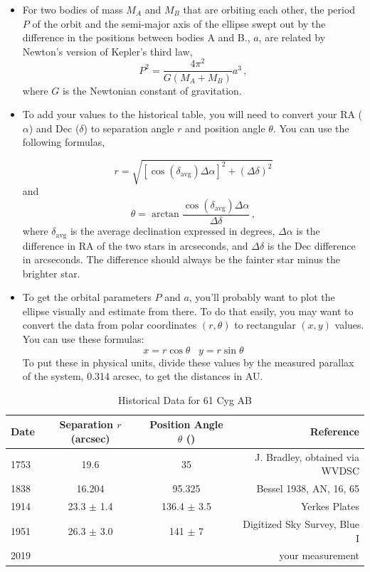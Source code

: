 \begin{itemize}
	\item For two bodies of mass $M_A$ and $M_B$ that are orbiting each other, the period $P$ of the orbit and the semi-major axis of the ellipse swept out by the difference in the positions between bodies A and B., $a$, are related by Newton's version of Kepler's third law,
	\begin{equation}
	P^2 = \frac{4\pi^2}{G(M_A + M_B)}a^3 \,,
	\end{equation}
	where $G$ is the Newtonian constant of gravitation.

	\item To add your values to the historical table, you will need to convert your RA ($\alpha$) and Dec ($\delta$) to separation angle $r$ and position angle $\theta$. You can use the following formulas,
	
	\begin{equation}
	r = \sqrt{[\cos(\delta_{\textrm{avg}})\Delta\alpha]^2 + (\Delta\delta)^2}
	\end{equation}
	and
	\begin{equation}
	\theta = \arctan{\frac{\cos(\delta_{\textrm{avg}})\Delta\alpha}{\Delta\delta}}\,,
	\end{equation}
	where $\delta_{\textrm{avg}}$ is the average declination expressed in degrees, $\Delta\alpha$ is the difference in RA of the two stars in arcseconds, and $\Delta\delta$ is the Dec difference in arcseconds. The difference should always be the fainter star minus the brighter star.
	
	\item To get the orbital parameters $P$ and $a$, you'll probably want to plot the ellipse visually and estimate from there. To do that easily, you may want to convert the data from polar coordinates $(r,\theta)$ to rectangular $(x,y)$ values. You can use these formulas:
	\begin{equation}
	x = r\cos\theta\;\;\;y = r\sin\theta
	\end{equation}
	To put these in physical units, divide these values by the measured parallax of the system, 0.314
	arcsec, to get the distances in AU.
\end{itemize}

\begin{table}
	\centering
	\caption{Historical Data for 61 Cyg AB}
	\label{61cyg_data}
	\begin{tabular}{|l|c|c|r|}
		\hline
		\textbf{Date} & \textbf{Separation $r$ (arcsec)} & \textbf{Position Angle $\theta$ (\textdegree)} & \textbf{Reference} \\
		\hline
		1753 & 19.6 & 35 & J. Bradley, obtained via WVDSC\\
		1838 & 16.204 & 95.325 & Bessel 1938, AN, 16, 65\\
		1914 & 23.3 $\pm$ 1.4 & 136.4 $\pm$ 3.5 & Yerkes Plates\\
		1951 & 26.3 $\pm$ 3.0 & 141 $\pm$ 7 & Digitized Sky Survey, Blue I\\
		2019 & & & your measurement\\
		\hline
	\end{tabular}
\end{table}

